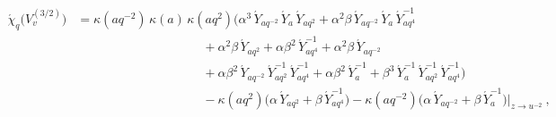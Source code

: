 \documentclass[11pt]{amsart}
\numberwithin{equation}{section}
\numberwithin{equation}{section}
\begin{document}
\begin{appendix}
{\small
	\begin{align}
		\acute{\chi}_q\big(V_v^{(3/2)}\big)
		&= \kappa(aq^{-2})\,\kappa(a)\,\kappa(aq^{2})\Big(
		\alpha^{3}\, {\acute Y}_{aq^{-2}}\,{\acute Y}_{a}\,{\acute Y}_{aq^{2}}
		+ \alpha^{2}\beta\, {\acute Y}_{aq^{-2}}\,{\acute Y}_{a}\,{\acute Y}_{aq^{4}}^{-1}\nonumber \\
		&\qquad\qquad\qquad\qquad\qquad
		+ \alpha^{2}\beta\, {\acute Y}_{aq^{2}}
		+ \alpha\beta^{2}\, {\acute Y}_{aq^{4}}^{-1}
		+ \alpha^{2}\beta\, {\acute Y}_{aq^{-2}} \nonumber\\
		&\qquad \qquad\qquad\qquad\qquad
		+ \alpha\beta^{2}\, {\acute Y}_{aq^{-2}}\,{\acute Y}_{aq^{2}}^{-1}\,{\acute Y}_{aq^{4}}^{-1}
		+ \alpha\beta^{2}\, {\acute Y}_{a}^{-1}
		+ \beta^{3}\, {\acute Y}_{a}^{-1}\,{\acute Y}_{aq^{2}}^{-1}\,{\acute Y}_{aq^{4}}^{-1}
		\Big) \label{eq:chi32} \\
		&\quad \qquad\qquad\qquad\qquad\quad
		- \kappa(aq^{2})\big(\alpha\, {\acute Y}_{aq^{2}} + \beta\, {\acute Y}_{aq^{4}}^{-1}\big)
		- \kappa(aq^{-2})\big(\alpha\, {\acute Y}_{aq^{-2}} + \beta\, {\acute Y}_{a}^{-1}\big)\Bigg|_{z\rightarrow u^{-2}}\ ,\nonumber
	\end{align}
}
	

\end{appendix}
\end{document}
